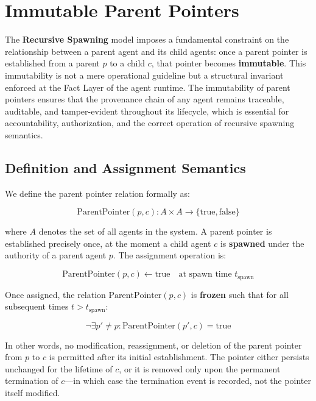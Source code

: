 \section{Immutable Parent Pointers}

The \textbf{Recursive Spawning} model imposes a fundamental constraint on the relationship between a parent agent and its child agents: once a parent pointer is established from a parent \(p\) to a child \(c\), that pointer becomes \textbf{immutable}. This immutability is not a mere operational guideline but a structural invariant enforced at the Fact Layer of the agent runtime. The immutability of parent pointers ensures that the provenance chain of any agent remains traceable, auditable, and tamper-evident throughout its lifecycle, which is essential for accountability, authorization, and the correct operation of recursive spawning semantics.

\subsection{Definition and Assignment Semantics}

We define the parent pointer relation formally as:

\begin{equation}
\text{ParentPointer}(p, c) : A \times A \to \{\text{true}, \text{false}\}
\end{equation}

where \(A\) denotes the set of all agents in the system. A parent pointer is established precisely once, at the moment a child agent \(c\) is \textbf{spawned} under the authority of a parent agent \(p\). The assignment operation is:

\begin{equation}
\text{ParentPointer}(p, c) \gets \text{true} \quad \text{at spawn time } t_{\text{spawn}}
\end{equation}

Once assigned, the relation \(\text{ParentPointer}(p, c)\) is \textbf{frozen} such that for all subsequent times \(t > t_{\text{spawn}}\):

\begin{equation}
\neg \exists p' \neq p : \text{ParentPointer}(p', c) = \text{true}
\end{equation}

In other words, no modification, reassignment, or deletion of the parent pointer from \(p\) to \(c\) is permitted after its initial establishment. The pointer either persists unchanged for the lifetime of \(c\), or it is removed only upon the permanent termination of \(c\)---in which case the termination event is recorded, not the pointer itself modified.

